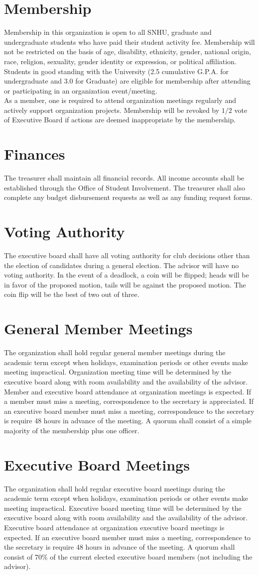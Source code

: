 \documentclass{article}
\newcommand{\article}[1]{\section{#1} \label{#1}}
\begin{document}
\article{Membership}
Membership in this organization is open to all SNHU, graduate and undergraduate students who have paid their student activity fee. 
Membership will not be restricted on the basis of age, disability, ethnicity, gender, national origin, race, religion, sexuality, gender identity or expression, or political affiliation. 
Students in good standing with the University (2.5 cumulative  G.P.A. for undergraduate and 3.0 for Graduate) are eligible for membership after attending or participating in an organization event/meeting.\\

As a member, one is required to attend organization meetings regularly and actively support organization projects. 
Membership will be revoked by $1/2$ vote of Executive Board if actions are deemed inappropriate by the membership.

\article{Finances}
The treasurer shall maintain all financial records. 
All income accounts shall be established through the Office of Student Involvement. 
The treasurer shall also complete any budget disbursement requests as well as any funding request forms.

\article{Voting Authority}
The executive board shall have all voting authority for club decisions other than the election of candidates during a general election. 
The advisor will have no voting authority. 
In the event of a deadlock, a coin will be flipped; heads will be in favor of the proposed motion, tails will be against the proposed motion. 
The coin flip will be the best of two out of three.

\article{General Member Meetings}
The organization shall hold regular general member meetings during the academic term except when holidays, examination periods or other events make meeting impractical. 
Organization meeting time will be determined by the executive board along with room availability and the availability of the advisor. 
Member and executive board attendance at organization meetings is expected. 
If a member must miss a meeting, correspondence to the secretary is appreciated. 
If an executive board member must miss a meeting, correspondence to the secretary is require 48 hours in advance of the meeting. 
A quorum shall consist of a simple majority of the membership plus one officer.
 
\article{Executive Board Meetings}
The organization shall hold regular executive board meetings during the academic term except when holidays, examination periods or other events make meeting impractical. 
Executive board meeting time will be determined by the executive board along with room availability and the availability of the advisor. 
Executive board attendance at organization executive board meetings is expected. 
If an executive board member must miss a meeting, correspondence to the secretary is require 48 hours in advance of the meeting. 
A quorum shall consist of 70\% of the current elected executive board members (not including the advisor). 
\end{document}
